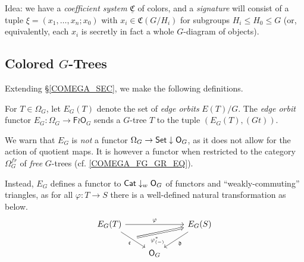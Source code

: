 \documentclass[a4paper,10pt
]{article}%
\renewcommand{\phi}{\varphi}
\newcommand{\UC}{\underline{\mathfrak C}}
\renewcommand{\1}{\ensuremath{\mathbb{id}}}
\begin{document}
Idea: we have a \textit{coefficient system} $\UC$ of colors, and
a \textit{signature} will consist of a tuple $\xi = (x_1, \dots, x_n;x_0)$
with $x_i \in \mathfrak C(G/H_i)$ for subgroups $H_i \leq H_0 \leq G$
(or, equivalently, each $x_i$ is secretly in fact a whole $G$-diagram of objects).

\subsection{Colored $G$-Trees}

Extending \S \ref{COMEGA_SEC}, we make the following definitions.

\begin{definition}
      \label{EG_DEFN}
      For $T \in \Omega_G$, let $E_G(T)$ denote the set of \textit{edge orbits} $E(T)/G$.
      The \textit{edge orbit} functor $E_G: \Omega_G \to \mathsf F \wr \mathsf O_G$ sends a $G$-tree $T$ to
      the tuple $(E_G(T), (Gt))$.
\end{definition}


We warn that $E_G$ is \textit{not} a functor
$\Omega_G \to \mathsf{Set} \downarrow \mathsf O_G$,
as it does not allow for the action of quotient maps.
It is however a functor when restricted to the category $\Omega_G^{fr}$ of \textit{free} $G$-trees
(cf. \eqref{COMEGA_FG_GR_EQ}).

Instead, $E_G$ defines a functor to $\mathsf{Cat} \downarrow_w \mathsf O_G$ of functors and ``weakly-commuting'' triangles,
as for all $\phi: T \to S$ there is a well-defined natural transformation as below.
\begin{equation}
      \begin{tikzcd}
            E_G(T) \arrow[rr, "\phi"] \arrow[dr, "\mathfrak c"', ""{name = U}]
            &&
            |[alias = V]| E_G(S) \arrow[dl, "\mathfrak d"]
            \\
            &
            \mathsf O_G
            \arrow[Rightarrow, from = U, to = V, "\phi_{(-)}^{\**}"'{near start}]
      \end{tikzcd}
\end{equation}
\end{document}
